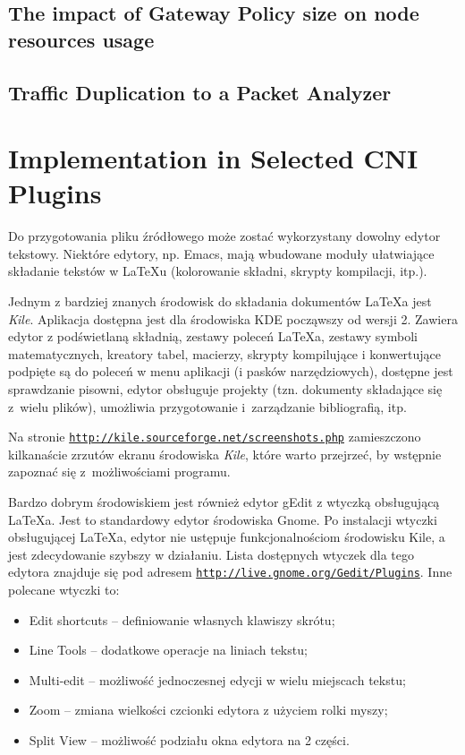 \subsection{The impact of Gateway Policy size on node resources usage}
\label{subsection:impact}

\subsection{Traffic Duplication to a Packet Analyzer}
\label{subsection:duplication}

\section{Implementation in Selected CNI Plugins}
\label{sec:ingress_impl}


Do przygotowania pliku źródłowego może zostać wykorzystany dowolny edytor tekstowy. Niektóre edytory, np. Emacs, mają wbudowane moduły ułatwiające składanie tekstów w LaTeXu (kolorowanie składni, skrypty kompilacji, itp.).

Jednym z bardziej znanych środowisk do składania dokumentów  \LaTeX a jest {\em Kile}. Aplikacja dostępna jest dla środowiska KDE począwszy od wersji 2. Zawiera edytor z podświetlaną składnią, zestawy poleceń \LaTeX a, zestawy symboli matematycznych, kreatory tabel, macierzy, skrypty kompilujące i konwertujące podpięte są do poleceń w menu aplikacji (i pasków narzędziowych), dostępne jest sprawdzanie pisowni, edytor obsługuje projekty (tzn. dokumenty składające się z~wielu plików), umożliwia przygotowanie i~zarządzanie bibliografią, itp.

Na stronie \underline{\texttt{http://kile.sourceforge.net/screenshots.php}} zamieszczono kilkanaście zrzutów ekranu środowiska {\em Kile}, które warto przejrzeć, by wstępnie zapoznać się z~możliwościami programu.

Bardzo dobrym środowiskiem jest również edytor gEdit z wtyczką obsługującą \LaTeX a. Jest to standardowy edytor środowiska Gnome. Po instalacji wtyczki obsługującej \LaTeX a, edytor nie ustępuje funkcjonalnościom środowisku Kile, a jest zdecydowanie szybszy w działaniu. Lista dostępnych wtyczek dla tego edytora znajduje się pod adresem \underline{\texttt{http://live.gnome.org/Gedit/Plugins}}. Inne polecane wtyczki to: 
\begin{itemize}
\item Edit shortcuts -- definiowanie własnych klawiszy skrótu;
\item Line Tools -- dodatkowe operacje na liniach tekstu;
\item Multi-edit -- możliwość jednoczesnej edycji w wielu miejscach tekstu;
\item Zoom -- zmiana wielkości czcionki edytora z użyciem rolki myszy;
\item Split View -- możliwość podziału okna edytora na 2 części. 
\end{itemize}



